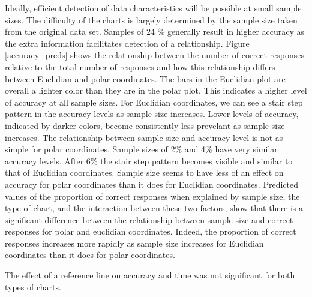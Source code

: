 Ideally, efficient detection of data characteristics will be possible at small sample sizes. The difficulty of the charts is largely determined by the sample size taken from the original data set. Samples of 24 \% generally result in higher accuracy as the extra information facilitates detection of a relationship. Figure \ref{accuracy_preds} shows the relationship between the number of correct responses relative to the total number of responses and how this relationship differs between Euclidian and polar coordinates. The bars in the Euclidian plot are overall a lighter color than they are in the polar plot. This indicates a higher level of accuracy at all sample sizes. For Euclidian coordinates, we can see a stair step pattern in the accuracy levels as sample size increases. Lower levels of accuracy, indicated by darker colors, become consistently less prevelant as sample size increases. The relationship between sample size and accuracy level is not as simple for polar coordinates. Sample sizes of 2\% and 4\% have very similar accuracy levels. After 6\% the stair step pattern becomes visible and similar to that of Euclidian coordinates. Sample size seems to have less of an effect on accuracy for polar coordinates than it does for Euclidian coordinates. Predicted values of the proportion of correct responses when explained by sample size, the type of chart, and the interaction between these two factors, show that there is a significant difference between the relationship between sample size and correct responses for polar and euclidian coordinates. Indeed, the proportion of correct responses increases more rapidly as sample size increases for Euclidian coordinates than it does for polar coordinates. 

The effect of a reference line on accuracy and time was not significant for both types of charts.  








